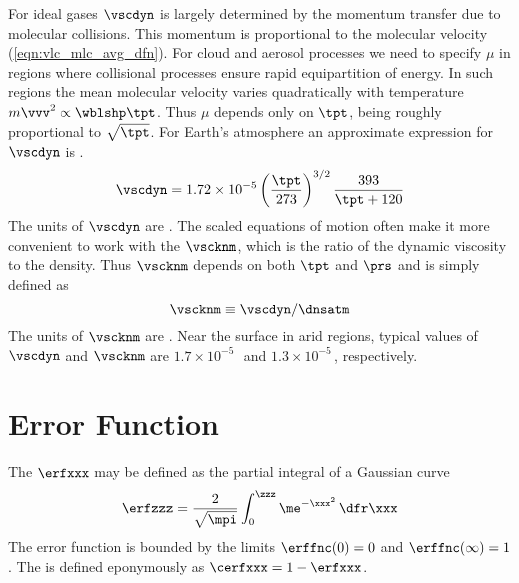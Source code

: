 \documentclass[12pt,twoside]{book}
\begin{document}
For ideal gases $\vscdyn$ is largely determined by the momentum
transfer due to molecular collisions.
This momentum is proportional to the molecular velocity
(\ref{eqn:vlc_mlc_avg_dfn}). 
For cloud and aerosol processes we need to specify $\mu$ in regions
where collisional processes ensure rapid equipartition of energy.
In such regions the mean molecular velocity varies quadratically with
temperature $m\vvv^{2} \propto \wblshp \tpt$.
Thus $\mu$ depends only on $\tpt$, being roughly proportional to
$\sqrt{\tpt}$. 
For Earth's atmosphere an approximate expression for $\vscdyn$ is 
\cite[][p. 102]{RoY94}.
\begin{equation}
\vscdyn = 1.72 \times 10^{-5} \left( \frac{\tpt}{273 } \right)^{3/2}
\frac{393}{\tpt + 120 } 
\label{eqn:vsc_dyn_dfn}
\end{equation}
The units of $\vscdyn$ are \kgxms.
The scaled equations of motion often make it more convenient to work
with the  $\vscknm$, which is the ratio
of the dynamic viscosity to the density.
Thus $\vscknm$ depends on both $\tpt$ and $\prs$ and is simply defined  
as 
\begin{equation}
\vscknm \equiv \vscdyn / \dnsatm
\label{eqn:vsc_knm_dfn}
\end{equation}
The units of $\vscknm$ are \mSxs.
Near the surface in arid regions, typical values of $\vscdyn$ and 
$\vscknm$ are $1.7 \times 10^{-5}$\,\kgxms\ and 
$1.3 \times 10^{-5}$\,\mSxs, respectively. 

\section[Error Function]{Error Function}\label{sxn:erf}
The  $\erfxxx$ may be defined as the partial
integral of a Gaussian curve
\begin{equation}
\erfzzz = \frac{2}{\sqrt{\mpi}} \int_{0}^{\zzz} \me^{-\xxx^{2}} \,\dfr\xxx
\label{eqn:erf}
\end{equation}
The error function is bounded by the limits $\erffnc(0) = 0$ and
$\erffnc(\infty) = 1$. 
The  is defined eponymously as 
$\cerfxxx = 1 - \erfxxx$.
\end{document}

